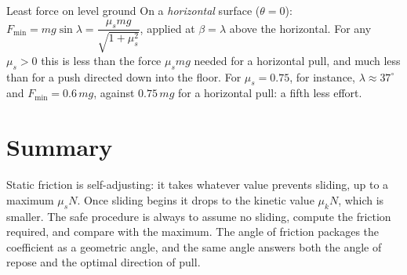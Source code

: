 \begin{figure}[htbp]
\centering
{}
\end{figure}

\begin{keybox}{Least force on level ground}
On a \emph{horizontal} surface ($\theta=0$): $F_{\min}=mg\sin\lambda=\dfrac{\mu_s mg}{\sqrt{1+\mu_s^2}}$,
applied at $\beta=\lambda$ above the horizontal. For any $\mu_s>0$ this is less than the force $\mu_s mg$
needed for a horizontal pull, and much less than for a push directed down into the floor. For
$\mu_s=0.75$, for instance, $\lambda\approx37^\circ$ and $F_{\min}=0.6\,mg$, against $0.75\,mg$ for a
horizontal pull: a fifth less effort.
\end{keybox}

\section{Summary}\label{sec:summary9}
Static friction is self-adjusting: it takes whatever value prevents sliding, up to a maximum $\mu_s N$.
Once sliding begins it drops to the kinetic value $\mu_k N$, which is smaller. The safe procedure is always
to assume no sliding, compute the friction required, and compare with the maximum. The angle of friction
packages the coefficient as a geometric angle, and the same angle answers both the angle of repose and the
optimal direction of pull.


